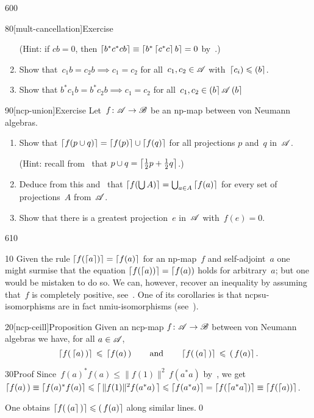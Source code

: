 \begin{parsec}{600}
\begin{point}{80}[mult-cancellation]{Exercise}
\begin{enumerate}
(Hint: if $cb=0$,
then $\left\lceil b^*c^*cb\right\rceil\equiv \left\lceil b^*\left\lceil c^*c\right\rceil b\right\rceil=0$
by~.)
\item
Show that~$c_1b=c_2b \implies c_1=c_2$
for all~$c_1,c_2\in\mathscr{A}$
with~$\left\lceil c_i\right)\leqslant \left(b\right\rceil$.
\item
Show that $b^*c_1b=b^*c_2b\implies c_1=c_2$
for all~$c_1,c_2\in\left(b\right\rceil\mathscr{A}\left(b\right\rceil$
\end{enumerate}
\spacingfix%
\end{point}%
\begin{point}{90}[ncp-union]{Exercise}%
Let~$f\colon \mathscr{A}\to\mathscr{B}$ be an np-map
between von Neumann algebras.
\begin{enumerate}
\item
Show that
$\left\lceil f(p\cup q)\right\rceil
= \left\lceil f(p)\right\rceil\cup\left\lceil f(q)\right\rceil$
for all projections $p$ and~$q$ in~$\mathscr{A}$.

(Hint: recall from~ 
that $p\cup q = \left\lceil\frac{1}{2}p+\frac{1}{2}q\right\rceil$.)

\item
Deduce from this and~ that $\left\lceil f(\bigcup A)\right\rceil=\bigcup_{a\in A}\left\lceil f(a)\right\rceil$
for every set of projections~$A$ from~$\mathscr{A}$.

\item
Show that there is a greatest projection~$e$
in~$\mathscr{A}$ with~$f(e)=0$.
\end{enumerate}
\spacingfix%
\end{point}%
\end{parsec}%
\begin{parsec}{610}%
\begin{point}{10}%
Given the rule $\left\lceil f(\left\lceil a\right\rceil)\right\rceil=\left\lceil f(a)\right\rceil$
for an np-map~$f$ and self-adjoint~$a$
one might surmise that
the equation $\left\lceil f(\left\lceil a\right))\right\rceil=\left\lceil f(a)\right)$
holds 
for arbitrary~$a$;
but
one would be mistaken to do so.
We can, however,
recover an inequality
by assuming that~$f$ is completely positive, see~.
One of its corollaries is
that ncpsu-isomorphisms
are in fact nmiu-isomorphisms (see~).
\end{point}
\begin{point}{20}[ncp-ceill]{Proposition}%
Given an ncp-map $f\colon \mathscr{A}\to\mathscr{B}$
between von Neumann algebras
we have,
for all
$a\in\mathscr{A}$,
\begin{equation*}
	\left\lceil f(\,\left\lceil a\right)\,)\right\rceil\,\leqslant\, \left\lceil f(a)\,\right)
	\qquad\text{and}\qquad
	\left\lceil f(\,\left(a\right\rceil\,)\right\rceil\,\leqslant\, \left(\,f(a)\right\rceil.
\end{equation*}
\spacingfix%
\begin{point}{30}{Proof}%
Since~$f(a)^*f(a)\leq \|f(1)\|^2\,f(a^*a)$
 by~,
we get~$\left\lceil f(a)\,\right)\equiv \left\lceil f(a)^*f(a)\right\rceil
	\leqslant \left\lceil\,\smash{\|f(1)\|^2f(a^*a)}\,\right\rceil
	\leqslant \left\lceil f(a^*a)\right\rceil
	=\left\lceil f(\left\lceil a^*a\right\rceil)\right\rceil
	\equiv \left\lceil f(\left\lceil a\right))\right\rceil$.

One obtains $\left\lceil f(\,\left(a\right\rceil\,)\right\rceil\leqslant \left(\,f(a)\right\rceil$
along similar lines.\qed
\end{point}
\end{point}
\end{parsec}%
